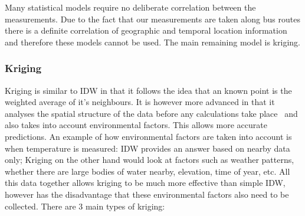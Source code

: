 Many statistical models require no deliberate correlation between the measurements. Due to the fact that our measurements are taken along bus routes there is a definite correlation of geographic and temporal location information and therefore these models cannot be used. The main remaining model is kriging.

\subsubsection{Kriging}

Kriging is similar to IDW in that it follows the idea that an known point is the weighted average of it's neighbours. It is however more advanced in that it analyses the spatial structure of the data before any calculations take place~\cite{geostatisticalradiomapping} and also takes into account environmental factors. This allows more accurate predictions. An example of how environmental factors are taken into account is when temperature is measured: IDW provides an answer based on nearby data only; Kriging on the other hand would look at factors such as weather patterns, whether there are large bodies of water nearby, elevation, time of year, etc. All this data together allows kriging to be much more effective than simple IDW, however has the disadvantage that these environmental factors also need to be collected. There are 3 main types of kriging:

